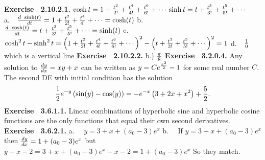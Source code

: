  {\noindent \protect \bf  Exercise ~2.10.2.1.} $\protect \qopname  \relax o{cosh}{t} = 1+\protect \frac  {t^2}{2!} + \protect \frac  {t^4}{4!}+\protect \frac  {t^6}{6!} + \protect \cdots  $\protect \newline  $\protect \qopname  \relax o{sinh}{t} = t + \protect \frac  {t^3}{3!} + \protect \frac  {t^5}{5!}+ \protect \cdots  $ \protect \newline  a.~~$\protect \frac  {d ~\protect \qopname  \relax o{sinh}(t)}{dt} = 1+\protect \frac  {t^2}{2!}+\protect \frac  {t^4}{4!} + \protect \cdots  =\protect \qopname  \relax o{cosh}(t)$ \protect \newline  b.~~$\protect \frac  {d ~\protect \qopname  \relax o{cosh}(t)}{dt} = t+\protect \frac  {t^3}{3!}+\protect \frac  {t^5}{5!} + \protect \cdots  =\protect \qopname  \relax o{sinh}(t)$ \protect \newline  c.~~$ \protect \qopname  \relax o{cosh}^2{t}- \protect \qopname  \relax o{sinh}^2{t} = \left (1+\protect \frac  {t^2}{2!} + \protect \frac  {t^4}{4!}+\protect \frac  {t^6}{6!} + \protect \cdots  \right )^2 - \left (t + \protect \frac  {t^3}{3!} + \protect \frac  {t^5}{5!}+ \protect \cdots  \right )^2 = 1 $ \protect \newline  d.~~$\protect \frac  {1}{0}$ which is a vertical line \protect \newline  \protect \newline  
 {\noindent \protect \bf  Exercise ~2.10.2.2.}  b.) $\protect \frac  {\pi }{8}$\protect \newline   \protect \newline  \protect \newline  
 {\noindent \protect \bf  Exercise ~3.2.0.4.} Any solution to $\protect \frac  {dy}{dx}=xy+x$ can be written as $y=Ce^{\protect \frac  {x^2}{2}}-1$ for some real number $C$. The second DE with initial condition has the solution $$\protect \frac  {1}{2}e^{-y}\left (\protect \qopname  \relax o{sin}(y)-\protect \qopname  \relax o{cos}(y)\right )=-e^{-x}\left (3+2x+x^2\right )+\protect \frac  {5}{2}. $$ \protect \newline  \protect \newline  
 {\noindent \protect \bf  Exercise ~3.6.1.1.} Linear combinations of hyperbolic sine and hyperbolic cosine functions are the only functions that equal their own second derivatives.  \protect \newline  \protect \newline  
 {\noindent \protect \bf  Exercise ~3.6.2.1.} a.~~ $y=3 +x + (a_0-3)e^x$ b.~~ If $y =3 +x + (a_0-3)e^x$ then $\protect \frac  {dy}{dx} = 1 +(a_0-3)e^x$ but $y-x-2 = 3+x+(a_0-3)e^x -x-2 = 1 + (a_0-3)e^x$ So they match.  \protect \newline  \protect \newline  
